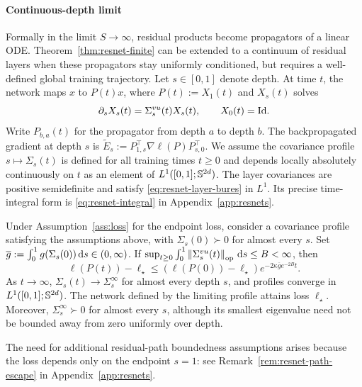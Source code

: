 \paragraph{Continuous-depth limit}
Formally in the limit $S \to \infty$, residual products become propagators of a linear ODE.
Theorem~\ref{thm:resnet-finite} can be extended to a continuum of residual layers when these propagators stay uniformly conditioned, but requires a well-defined global training trajectory.
Let $s\in[0,1]$ denote depth. At time $t$, the network maps $x$ to
$P(t)x$, where $P(t):=X_1(t)$ and $X_s(t)$ solves
\[
 \partial_s X_s(t)=\Sigma^{vu}_s(t)X_s(t),\qquad X_0(t)=\mathrm{Id}.
\]
Write $P_{b,a}(t)$ for the propagator from depth $a$ to depth $b$. The backpropagated gradient at depth $s$ is
$\widetilde E_s:=P_{1,s}^\top\nabla\ell(P)P_{s,0}^\top$.
We assume the covariance profile $s\mapsto\Sigma_s(t)$ is defined for all
training times $t\ge0$ and depends locally absolutely continuously on $t$
as an element of $L^1([0,1];\mathbb{S}^{2d})$.
The layer covariances are positive semidefinite and satisfy
\eqref{eq:resnet-layer-bures} in $L^1$. Its precise time-integral form is
\eqref{eq:resnet-integral} in Appendix~\ref{app:resnets}.

\begin{theorem}
\label{thm:resnet-continuous}
Under Assumption~\ref{ass:loss} for the endpoint loss, consider a covariance profile satisfying the assumptions above, with $\Sigma_s(0)\succ0$ for almost every $s$.
Set $\overline g:=\int_0^1g(\Sigma_s(0))\,\mathrm{d} s\in(0,\infty)$.
If $\sup_{t\ge0}\int_0^1\left\lVert \Sigma^{vu}_s(t) \right\rVert_{\mathrm{op}}\,\mathrm{d} s\le B<\infty$, then
\begin{equation}\label{eq:continuous-resnet-rate}
 \ell(P(t))-\ell_\star
 \le(\ell(P(0))-\ell_\star)e^{-2\kappa\overline g e^{-2B}t}.
\end{equation}
As $t\to\infty$, $\Sigma_s(t) \to \Sigma_s^\infty$ for almost every
depth $s$, and profiles converge in $L^1([0,1];\mathbb{S}^{2d})$.
The network defined by the limiting profile attains loss $\ell_\star$.
Moreover, $\Sigma_s^\infty\succ0$ for almost every $s$, although its smallest
eigenvalue need not be bounded away from zero uniformly over depth.
\end{theorem}

The need for additional residual-path boundedness assumptions arises because the loss depends only on the endpoint $s = 1$: see Remark~\ref{rem:resnet-path-escape} in Appendix~\ref{app:resnets}.

